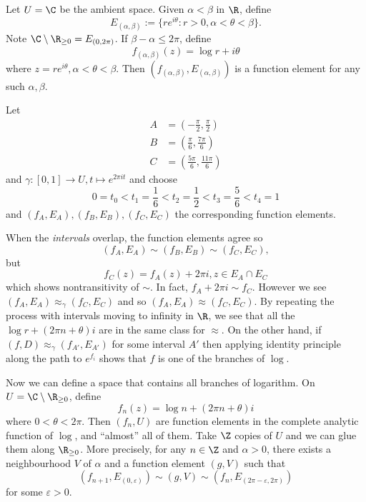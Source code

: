 \documentclass[a4paper]{article}
\begin{document}
\begin{eg}
  Let \(U = \C\) be the ambient space. Given \(\alpha < \beta\) in \(\R\), define
  \[
    E_{(\alpha, \beta)} := \{r e^{i \theta}: r > 0, \alpha < \theta < \beta\}.
  \]
  Note \(\C \setminus \R_{\geq 0} = E_{(0, 2\pi)}\). If \(\beta - \alpha \leq 2\pi\), define
  \[
    f_{(\alpha, \beta)}(z) = \log r + i\theta
  \]
  where \(z = re^{i\theta}, \alpha < \theta < \beta\). Then \((f_{(\alpha, \beta)}, E_{(\alpha, \beta)})\) is a function element for any such \(\alpha, \beta\).

  Let
  \begin{align*}
    A &= (-\frac{\pi}{2}, \frac{\pi}{2}) \\
    B &= (\frac{\pi}{6}, \frac{7\pi}{6}) \\
    C &= (\frac{5\pi}{6}, \frac{11\pi}{6})
  \end{align*}
  and \(\gamma: [0, 1] \to U, t \mapsto e^{2\pi i t}\) and choose
  \[
    0 = t_0 < t_1 = \frac{1}{6} < t_2 = \frac{1}{2} < t_3 = \frac{5}{6} < t_4 = 1
  \]
  and \((f_A, E_A), (f_B, E_B), (f_C, E_C)\) the corresponding function elements.

  When the \emph{intervals} overlap, the function elements agree so
  \[
    (f_A, E_A) \sim (f_B, E_B) \sim (f_C, E_C),
  \]
  but
  \[
    f_C(z) = f_A(z) + 2\pi i, z \in E_A \cap E_C
  \]
  which shows nontransitivity of \(\sim\). In fact, \(f_A + 2\pi i \sim f_C\). However we see \((f_A, E_A) \approx_\gamma (f_C, E_C)\) and so \((f_A, E_A) \approx (f_C, E_C)\). By repeating the process with intervals moving to infinity in \(\R\), we see that all the \(\log r + (2\pi n + \theta) i\) are in the same class for \(\approx\). On the other hand, if \((f, D) \approx_\gamma (f_{A'}, E_{A'})\) for some interval \(A'\) then applying identity principle along the path to \(e^{f_i}\) shows that \(f\) is one of the branches of \(\log\).

  Now we can define a space that contains all branches of logarithm. On \(U = \C \setminus \R_{\geq 0}\), define
  \[
    f_n(z) = \log n + (2\pi n + \theta)i
  \]
  where \(0 < \theta < 2\pi\). Then \((f_n, U)\) are function elements in the complete analytic function of \(\log\), and ``almost'' all of them. Take \(\Z\) copies of \(U\) and we can glue them along \(\R_{\geq 0}\). More precisely, for any \(n \in \Z\) and \(\alpha > 0\), there exists a neighbourhood \(V\) of \(\alpha\) and a function element \((g, V)\) such that
  \[
    (f_{n + 1}, E_{(0, \varepsilon)}) \sim (g, V) \sim (f_n, E_{(2\pi - \varepsilon, 2\pi)})
  \]
  for some \(\varepsilon > 0\).


\end{eg}
\end{document}
